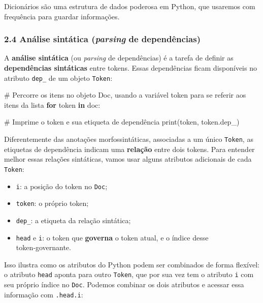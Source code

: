\documentclass[
  brazilian,
  11pt,
]{article}
\newenvironment{Shaded}{\begin{snugshade}}{\end{snugshade}}
\newcommand{\BuiltInTok}[1]{\textcolor[rgb]{0.50,0.55,0.55}{#1}}
\newcommand{\CommentTok}[1]{\textcolor[rgb]{0.48,0.49,0.49}{#1}}
\newcommand{\ControlFlowTok}[1]{\textcolor[rgb]{0.99,0.74,0.29}{\textbf{#1}}}
\newcommand{\KeywordTok}[1]{\textcolor[rgb]{0.81,0.81,0.76}{\textbf{#1}}}
\newcommand{\NormalTok}[1]{\textcolor[rgb]{0.81,0.81,0.76}{#1}}
\providecommand{\tightlist}{%
  \setlength{\itemsep}{0pt}\setlength{\parskip}{0pt}}
\let\oldtexttt\texttt
\renewcommand{\texttt}[1]{{\color{inlink}\oldtexttt{#1}}}
\begin{document}
Dicionários são uma estrutura de dados poderosa em Python, que usaremos
com frequência para guardar informações.

\subsubsection{\texorpdfstring{2.4 Análise sintática (\emph{parsing} de
dependências)}{2.4 Análise sintática (parsing de dependências)}}\label{anuxe1lise-sintuxe1tica-parsing-de-dependuxeancias}

A \textbf{análise sintática} (ou \emph{parsing} de dependências) é a
tarefa de definir as \textbf{dependências sintáticas} entre tokens.
Essas dependências ficam disponíveis no atributo \texttt{dep\_} de um
objeto \texttt{Token}:

\begin{Shaded}
\begin{Highlighting}[]
\CommentTok{\# Percorre os itens no objeto Doc, usando a variável \textquotesingle{}token\textquotesingle{} para se referir aos itens da lista}
\ControlFlowTok{for}\NormalTok{ token }\KeywordTok{in}\NormalTok{ doc:}

    \CommentTok{\# Imprime o token e sua etiqueta de dependência}
    \BuiltInTok{print}\NormalTok{(token, token.dep\_)}
\end{Highlighting}
\end{Shaded}

Diferentemente das anotações morfossintáticas, associadas a um único
\texttt{Token}, as etiquetas de dependência indicam uma \textbf{relação}
entre dois tokens. Para entender melhor essas relações sintáticas, vamos
usar alguns atributos adicionais de cada \texttt{Token}:

\begin{itemize}
\tightlist
\item
  \texttt{i}: a posição do token no \texttt{Doc};
\item
  \texttt{token}: o próprio token;
\item
  \texttt{dep\_}: a etiqueta da relação sintática;
\item
  \texttt{head} e \texttt{i}: o token que \textbf{governa} o token
  atual, e o índice desse token‑governante.
\end{itemize}

Isso ilustra como os atributos do Python podem ser combinados de forma
flexível: o atributo \texttt{head} aponta para outro \texttt{Token}, que
por sua vez tem o atributo \texttt{i} com seu próprio índice no
\texttt{Doc}. Podemos combinar os dois atributos e acessar essa
informação com \texttt{.head.i}:
\end{document}
